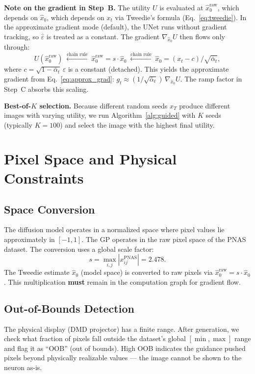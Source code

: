 \documentclass[11pt]{article}
\begin{document}
\noindent\textbf{Note on the gradient in Step~B.}
The utility $U$ is evaluated at $\hat x_0^{\text{raw}}$, which depends on
$\hat x_0$, which depends on $x_t$ via Tweedie's formula
(Eq.~\ref{eq:tweedie}).
In the approximate gradient mode (default), the UNet runs without gradient
tracking, so $\hat\varepsilon$ is treated as a constant.
The gradient $\nabla_{\hat x_0} U$ then flows only through:
\[
  U(\hat x_0^{\text{raw}})
  \;\xleftarrow{\text{chain rule}}\;
  \hat x_0^{\text{raw}} = s \cdot \hat x_0
  \;\xleftarrow{\text{chain rule}}\;
  \hat x_0 = (x_t - c) / \sqrt{\bar\alpha_t},
\]
where $c = \sqrt{1 - \bar\alpha_t}\,\hat\varepsilon$ is a constant (detached).
This yields the approximate gradient from Eq.~\eqref{eq:approx_grad}:
$g_t \approx (1/\sqrt{\bar\alpha_t})\, \nabla_{\hat x_0} U$.
The ramp factor in Step~C absorbs this scaling.

\noindent\textbf{Best-of-$K$ selection.}
Because different random seeds $x_T$ produce different images with varying
utility, we run Algorithm~\ref{alg:guided} with $K$ seeds (typically $K = 100$)
and select the image with the highest final utility.


\section{Pixel Space and Physical Constraints}

\subsection{Space Conversion}

The diffusion model operates in a normalized space where pixel values lie
approximately in $[-1, 1]$.
The GP operates in the raw pixel space of the PNAS dataset.
The conversion uses a global scale factor:
\[
  s = \max_{i,j} |x^{\text{PNAS}}_{ij}| = 2.478.
\]
The Tweedie estimate $\hat x_0$ (model space) is converted to raw pixels via
$\hat x_0^{\text{raw}} = s \cdot \hat x_0$.
This multiplication \textbf{must} remain in the computation graph for gradient
flow.

\subsection{Out-of-Bounds Detection}

The physical display (DMD projector) has a finite range.
After generation, we check what fraction of pixels fall outside the dataset's
global $[\min, \max]$ range and flag it as ``OOB'' (out of bounds).
High OOB indicates the guidance pushed pixels beyond physically realizable
values --- the image cannot be shown to the neuron as-is.
\end{document}
